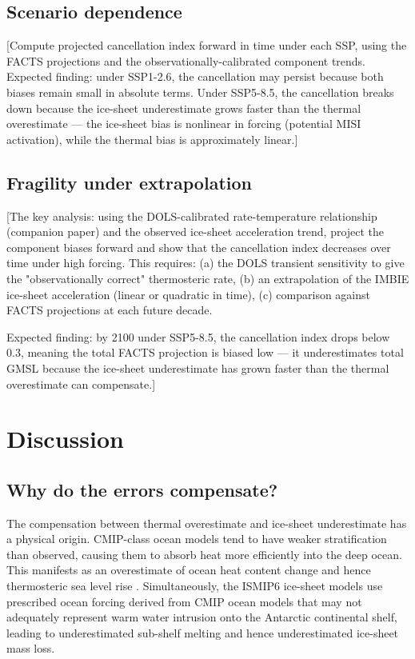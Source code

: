 \documentclass[11pt]{article}
\begin{document}
\subsection{Scenario dependence}
\label{sec:scenario}

[Compute projected cancellation index forward in time under each SSP, using the FACTS projections and the observationally-calibrated component trends. Expected finding: under SSP1-2.6, the cancellation may persist because both biases remain small in absolute terms. Under SSP5-8.5, the cancellation breaks down because the ice-sheet underestimate grows faster than the thermal overestimate — the ice-sheet bias is nonlinear in forcing (potential MISI activation), while the thermal bias is approximately linear.]

\subsection{Fragility under extrapolation}
\label{sec:extrapolation}

[The key analysis: using the DOLS-calibrated rate-temperature relationship (companion paper) and the observed ice-sheet acceleration trend, project the component biases forward and show that the cancellation index decreases over time under high forcing. This requires: (a) the DOLS transient sensitivity to give the "observationally correct" thermosteric rate, (b) an extrapolation of the IMBIE ice-sheet acceleration (linear or quadratic in time), (c) comparison against FACTS projections at each future decade.

Expected finding: by 2100 under SSP5-8.5, the cancellation index drops below 0.3, meaning the total FACTS projection is biased low — it underestimates total GMSL because the ice-sheet underestimate has grown faster than the thermal overestimate can compensate.]


\section{Discussion}
\label{sec:discussion}

\subsection{Why do the errors compensate?}

The compensation between thermal overestimate and ice-sheet underestimate has a physical origin.  CMIP-class ocean models tend to have weaker stratification than observed, causing them to absorb heat more efficiently into the deep ocean.  This manifests as an overestimate of ocean heat content change and hence thermosteric sea level rise \citep{kuhlbrodt2012ocean}.  Simultaneously, the ISMIP6 ice-sheet models use prescribed ocean forcing derived from CMIP ocean models that may not adequately represent warm water intrusion onto the Antarctic continental shelf, leading to underestimated sub-shelf melting and hence underestimated ice-sheet mass loss.
\end{document}
